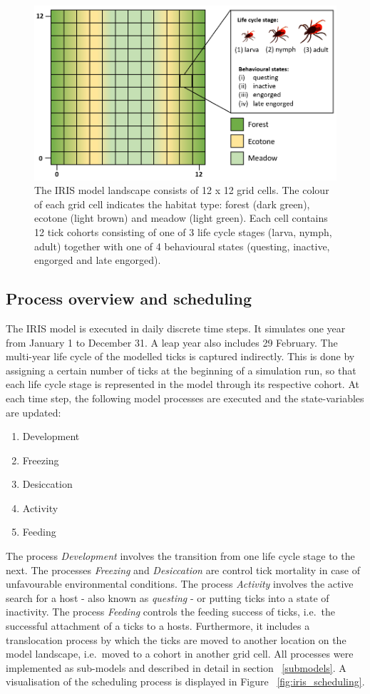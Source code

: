 \documentclass[a4paper, 11pt]{scrartcl}
\begin{document}
\begin{figure}[h!]
	\centering
	\includegraphics[width=0.7\linewidth]{figures/IRIS_landscape.PNG}
	\caption{The IRIS model landscape consists of 12 x 12 grid cells. The colour of each grid cell indicates the habitat type: forest (dark green), ecotone (light brown) and meadow (light green). Each cell contains 12 tick cohorts consisting of one of 3 life cycle stages (larva, nymph, adult) together with one of 4 behavioural states (questing, inactive, engorged and late engorged).}
	\label{fig:iris_landscape}
\end{figure}


\subsection{Process overview and scheduling}
The IRIS model is executed in daily discrete time steps. It simulates one year from January 1 to December 31. A leap year also includes 29 February. The multi-year life cycle of the modelled ticks is captured indirectly. This is done by assigning a certain number of ticks at the beginning of a simulation run, so that each life cycle stage is represented in the model through its respective cohort. At each time step, the following model processes are executed and the state-variables are updated:

\begin{enumerate}
	\item Development
	\item Freezing
	\item Desiccation
	\item Activity
	\item Feeding
\end{enumerate}

The process \emph{Development} involves the transition from one life cycle stage to the next. The processes \emph{Freezing} and \emph{Desiccation} are control tick mortality in case of unfavourable environmental conditions. The process \emph{Activity} involves the active search for a host - also known as \textit{questing} - or putting ticks into a state of inactivity. The process \emph{Feeding} controls the feeding success of ticks, i.e.\ the successful attachment of a ticks to a hosts. Furthermore, it includes a translocation process by which the ticks are moved to another location on the model landscape, i.e.\ moved to a cohort in another grid cell. All processes were implemented as sub-models and described in detail in section ~\ref{submodels}. A visualisation of the scheduling process is displayed in Figure ~\ref{fig:iris_scheduling}.
\end{document}
